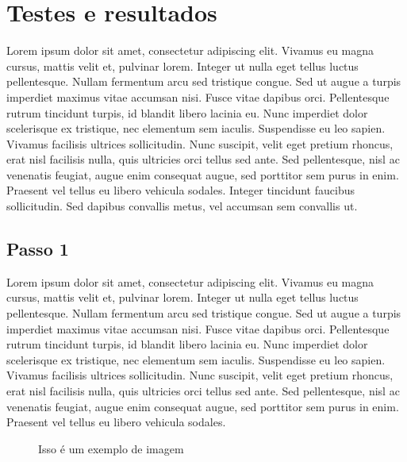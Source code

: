 \chapter{Testes e resultados}

Lorem ipsum dolor sit amet, consectetur adipiscing elit. Vivamus eu magna cursus, mattis velit et, pulvinar lorem. Integer ut nulla eget tellus luctus pellentesque. Nullam fermentum arcu sed tristique congue. Sed ut augue a turpis imperdiet maximus vitae accumsan nisi. Fusce vitae dapibus orci. Pellentesque rutrum tincidunt turpis, id blandit libero lacinia eu. Nunc imperdiet dolor scelerisque ex tristique, nec elementum sem iaculis. Suspendisse eu leo sapien. Vivamus facilisis ultrices sollicitudin. Nunc suscipit, velit eget pretium rhoncus, erat nisl facilisis nulla, quis ultricies orci tellus sed ante. Sed pellentesque, nisl ac venenatis feugiat, augue enim consequat augue, sed porttitor sem purus in enim. Praesent vel tellus eu libero vehicula sodales. Integer tincidunt faucibus sollicitudin. Sed dapibus convallis metus, vel accumsan sem convallis ut.

\section{Passo 1}

Lorem ipsum dolor sit amet, consectetur adipiscing elit. Vivamus eu magna cursus, mattis velit et, pulvinar lorem. Integer ut nulla eget tellus luctus pellentesque. Nullam fermentum arcu sed tristique congue. Sed ut augue a turpis imperdiet maximus vitae accumsan nisi. Fusce vitae dapibus orci. Pellentesque rutrum tincidunt turpis, id blandit libero lacinia eu. Nunc imperdiet dolor scelerisque ex tristique, nec elementum sem iaculis. Suspendisse eu leo sapien. Vivamus facilisis ultrices sollicitudin. Nunc suscipit, velit eget pretium rhoncus, erat nisl facilisis nulla, quis ultricies orci tellus sed ante. Sed pellentesque, nisl ac venenatis feugiat, augue enim consequat augue, sed porttitor sem purus in enim. Praesent vel tellus eu libero vehicula sodales.

\begin{figure}[htbp!]
\centering
\caption{Isso é um exemplo de imagem}
\hfill
{}
\end{figure}

